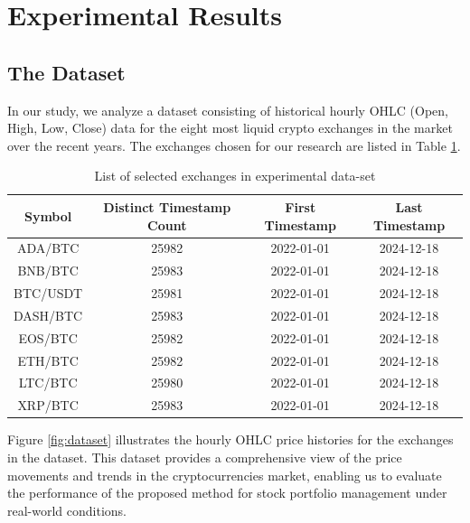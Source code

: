 \section{Experimental Results}

\subsection{The Dataset}

In our study, we analyze a dataset consisting of historical hourly OHLC (Open, High, Low, Close) data for the eight most liquid crypto exchanges in the market over the recent years. The exchanges chosen for our research are listed in Table \ref{tbl:data}.

\begin{table}[h]
	\centering
	\caption{List of selected exchanges in experimental data-set}
	\begin{tabular}{c|c|c|c}
		Symbol & Distinct Timestamp Count & First Timestamp & Last Timestamp \\
		\hline
		\hline
		ADA/BTC & 25982 & 2022-01-01& 2024-12-18 \\
		BNB/BTC & 25983 & 2022-01-01& 2024-12-18 \\
		BTC/USDT & 25981 & 2022-01-01& 2024-12-18 \\
		DASH/BTC & 25983 & 2022-01-01& 2024-12-18 \\
		EOS/BTC & 25982 & 2022-01-01& 2024-12-18 \\
		ETH/BTC & 25982 & 2022-01-01& 2024-12-18 \\
		LTC/BTC & 25980 & 2022-01-01& 2024-12-18 \\
		XRP/BTC & 25983 & 2022-01-01& 2024-12-18 \\
		
	\end{tabular}
	\label{tbl:data}

\end{table}

Figure \ref{fig:dataset} illustrates the hourly OHLC price histories for the exchanges in the dataset. This dataset provides a comprehensive view of the price movements and trends in the cryptocurrencies market, enabling us to evaluate the performance of the proposed method for stock portfolio management under real-world conditions. 

